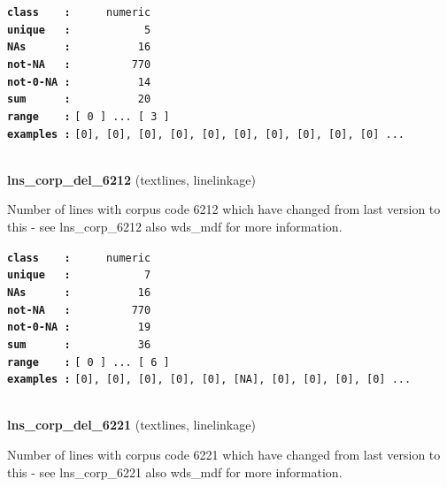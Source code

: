 \documentclass[]{article}
\begin{document}
\textbf{\texttt{class\ \ \ \ :}} \texttt{~~~~~numeric}\\
\textbf{\texttt{unique\ \ \ :}} \texttt{~~~~~~~~~~~5}\\
\textbf{\texttt{NAs\ \ \ \ \ \ :}} \texttt{~~~~~~~~~~16}\\
\textbf{\texttt{not-NA\ \ \ :}} \texttt{~~~~~~~~~770}\\
\textbf{\texttt{not-0-NA\ :}} \texttt{~~~~~~~~~~14}\\
\textbf{\texttt{sum\ \ \ \ \ \ :}} \texttt{~~~~~~~~~~20}\\
\textbf{\texttt{range\ \ \ \ :}}
\texttt{{[}\ 0\ {]}\ ...\ {[}\ 3\ {]}}\\
\textbf{\texttt{examples\ :}}
\texttt{{[}0{]},\ {[}0{]},\ {[}0{]},\ {[}0{]},\ {[}0{]},\ {[}0{]},\ {[}0{]},\ {[}0{]},\ {[}0{]},\ {[}0{]}\ ...}\\

~

\textbf{lns\_corp\_del\_6212} (textlines, linelinkage)

Number of lines with corpus code 6212 which have changed from last
version to this - see lns\_corp\_6212 also wds\_mdf for more
information.

\textbf{\texttt{class\ \ \ \ :}} \texttt{~~~~~numeric}\\
\textbf{\texttt{unique\ \ \ :}} \texttt{~~~~~~~~~~~7}\\
\textbf{\texttt{NAs\ \ \ \ \ \ :}} \texttt{~~~~~~~~~~16}\\
\textbf{\texttt{not-NA\ \ \ :}} \texttt{~~~~~~~~~770}\\
\textbf{\texttt{not-0-NA\ :}} \texttt{~~~~~~~~~~19}\\
\textbf{\texttt{sum\ \ \ \ \ \ :}} \texttt{~~~~~~~~~~36}\\
\textbf{\texttt{range\ \ \ \ :}}
\texttt{{[}\ 0\ {]}\ ...\ {[}\ 6\ {]}}\\
\textbf{\texttt{examples\ :}}
\texttt{{[}0{]},\ {[}0{]},\ {[}0{]},\ {[}0{]},\ {[}0{]},\ {[}NA{]},\ {[}0{]},\ {[}0{]},\ {[}0{]},\ {[}0{]}\ ...}\\

~

\textbf{lns\_corp\_del\_6221} (textlines, linelinkage)

Number of lines with corpus code 6221 which have changed from last
version to this - see lns\_corp\_6221 also wds\_mdf for more
information.
\end{document}
